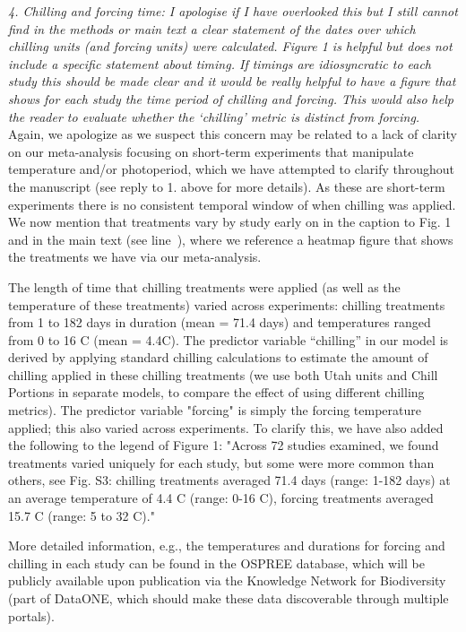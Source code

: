 \documentclass{article}
\newcommand{\lr}[1]{line~\lineref{#1}}
\begin{document}
\emph{4. Chilling and forcing time: I apologise if I have overlooked this but I still cannot find in the
methods or main text a clear statement of the dates over which chilling units (and forcing
units) were calculated. Figure 1 is helpful but does not include a specific statement about
timing. If timings are idiosyncratic to each study this should be made clear and it would be
really helpful to have a figure that shows for each study the time period of chilling and forcing.
This would also help the reader to evaluate whether the `chilling' metric is distinct from
forcing.}\\

Again, we apologize as we suspect this concern may be related to a lack of clarity on our meta-analysis focusing on short-term experiments that manipulate temperature and/or photoperiod, which we have attempted to clarify throughout the manuscript (see reply to 1. above for more details). As these are short-term experiments there is no consistent temporal window of when chilling was applied. We now mention that treatments vary by study early on in the caption to Fig. 1 and in the main text (see \lr{heatmap}), where we reference a heatmap figure that shows the treatments we have via our meta-analysis.

The length of time that chilling treatments were applied (as well as the temperature of these treatments) varied across experiments: chilling treatments from 1 to 182 days in duration (mean = 71.4 days) and temperatures ranged from  0 to 16 \degree C (mean = 4.4\degree C). The predictor variable ``chilling'' in our model is derived by applying standard chilling calculations to estimate the amount of chilling applied in these chilling treatments (we use both Utah units and Chill Portions in separate models, to compare the effect of using different chilling metrics). The predictor variable "forcing" is simply the forcing temperature applied; this also varied across experiments. To clarify this, we have also added the following to the legend of Figure 1: "Across 72 studies examined, we found treatments varied uniquely for each study, but some were more common than others, see Fig. S3: chilling treatments averaged 71.4 days (range: 1-182 days) at an average temperature of 4.4 \degree C (range: 0-16 \degree C), forcing treatments averaged 15.7 \degree C (range: 5 to 32 \degree C)."

More detailed information, e.g., the temperatures and durations for forcing and chilling in each study can be found in the OSPREE database, which will be publicly available upon publication via the Knowledge Network for Biodiversity (part of DataONE, which should make these data discoverable through multiple portals). \\
\end{document}
